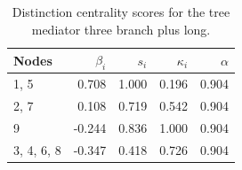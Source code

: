 \begin{table}
\centering
\caption{\label{tab:treemediator3l}Distinction centrality scores for the tree mediator three branch plus long.}
\centering
\begin{tabular}[t]{lrrrr}
\toprule
Nodes & $\beta_i$ & $s_i$ & $\kappa_i$ & $\alpha$\\
\midrule
1, 5 & 0.708 & 1.000 & 0.196 & 0.904\\
2, 7 & 0.108 & 0.719 & 0.542 & 0.904\\
9 & -0.244 & 0.836 & 1.000 & 0.904\\
3, 4, 6, 8 & -0.347 & 0.418 & 0.726 & 0.904\\
\bottomrule
\end{tabular}
\end{table}
